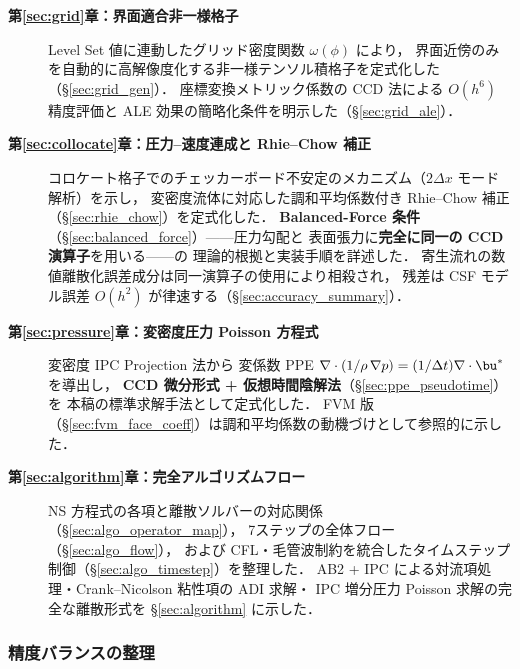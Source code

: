 \begin{description}
  \item[\textbf{第\ref{sec:grid}章：界面適合非一様格子}]
        Level Set 値に連動したグリッド密度関数 $\omega(\phi)$ により，
        界面近傍のみを自動的に高解像度化する非一様テンソル積格子を定式化した（§\ref{sec:grid_gen}）．
        座標変換メトリック係数の CCD 法による $O(h^6)$ 精度評価と
        ALE 効果の簡略化条件を明示した（§\ref{sec:grid_ale}）．

  \item[\textbf{第\ref{sec:collocate}章：圧力--速度連成と Rhie--Chow 補正}]
        コロケート格子でのチェッカーボード不安定のメカニズム（$2\Delta x$ モード解析）を示し，
        変密度流体に対応した調和平均係数付き Rhie--Chow 補正（§\ref{sec:rhie_chow}）を定式化した．
        \textbf{Balanced-Force 条件}（§\ref{sec:balanced_force}）——圧力勾配と
        表面張力に\textbf{完全に同一の CCD 演算子}を用いる——の
        理論的根拠と実装手順を詳述した．
        寄生流れの数値離散化誤差成分は同一演算子の使用により相殺され，
        残差は CSF モデル誤差 $O(h^2)$ が律速する（§\ref{sec:accuracy_summary}）．

  \item[\textbf{第\ref{sec:pressure}章：変密度圧力 Poisson 方程式}]
        変密度 IPC Projection 法から
        変係数 PPE $\nabla\cdot(1/\rho\,\nabla p) = (1/\Delta t)\nabla\cdot\bu^*$ を導出し，
        \textbf{CCD 微分形式 + 仮想時間陰解法}（§\ref{sec:ppe_pseudotime}）を
        本稿の標準求解手法として定式化した．
        FVM 版（§\ref{sec:fvm_face_coeff}）は調和平均係数の動機づけとして参照的に示した．

  \item[\textbf{第\ref{sec:algorithm}章：完全アルゴリズムフロー}]
        NS 方程式の各項と離散ソルバーの対応関係（§\ref{sec:algo_operator_map}），
        7ステップの全体フロー（§\ref{sec:algo_flow}），
        および CFL・毛管波制約を統合したタイムステップ制御（§\ref{sec:algo_timestep}）を整理した．
        AB2 + IPC による対流項処理・Crank--Nicolson 粘性項の ADI 求解・
        IPC 増分圧力 Poisson 求解の完全な離散形式を §\ref{sec:algorithm} に示した．
\end{description}

\subsubsection{精度バランスの整理}

